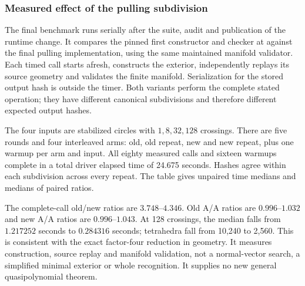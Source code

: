 \subsubsection{Measured effect of the pulling subdivision}

The final benchmark runs serially after the suite, audit and publication of
the runtime change. It compares the pinned first constructor and checker at
 against the final pulling implementation, using the same
maintained manifold validator. Each timed call starts afresh, constructs the
exterior, independently replays its source geometry and validates the finite
manifold. Serialization for the stored output hash is outside the timer.
Both variants perform the complete stated operation; they have different
canonical subdivisions and therefore different expected output hashes.

The four inputs are stabilized circles with $1,8,32,128$ crossings. There
are five rounds and four interleaved arms: old, old repeat, new and new
repeat, plus one warmup per arm and input. All eighty measured calls and
sixteen warmups complete in a total driver elapsed time of 24.675 seconds.
Hashes agree within each subdivision across every repeat. The table gives
unpaired time medians and medians of paired ratios.

\begin{center}
\small

\end{center}

The complete-call old/new ratios are $3.748$--$4.346$. Old A/A ratios are
$0.996$--$1.032$ and new A/A ratios are $0.996$--$1.043$. At 128 crossings,
the median falls from $1.217252$ seconds to $0.284316$ seconds; tetrahedra
fall from 10,240 to 2,560. This is consistent with the exact factor-four
reduction in geometry. It measures construction, source replay and manifold
validation, not a normal-vector search, a simplified minimal exterior or
whole recognition. It supplies no new general quasipolynomial theorem.
